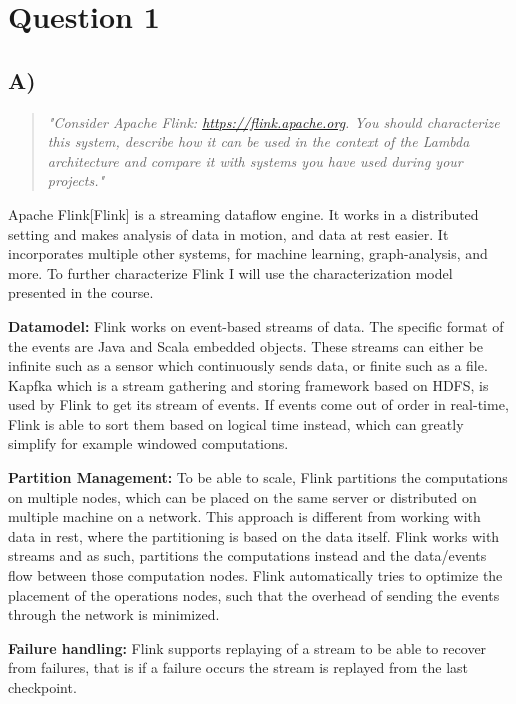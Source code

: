 \section{Question 1}

\subsection{A)}
\begin{quote}
	\textit{"Consider	Apache	Flink: \url{https://flink.apache.org}.	You	should	characterize	this	system,	describe	how	it	can	be	used	in	the	context	of	the	Lambda	architecture	and	compare	it	with	systems	you	have	used	during	your	projects."}
\end{quote}

\newpar Apache Flink[Flink] is a streaming dataflow engine. It works in a distributed setting and makes analysis of data in motion, and data at rest easier. It incorporates multiple other systems, for machine learning, graph-analysis, and more. To further characterize Flink I will use the characterization model presented in the course.

\newpar \textbf{Datamodel:} Flink works on event-based streams of data. The specific format of the events are Java and Scala embedded objects. These streams can either be infinite such as a sensor which continuously sends data, or finite such as a file. Kapfka which is a stream gathering and storing framework based on HDFS, is used by Flink to get its stream of events\cite{confluent-flink}. If events come out of order in real-time, Flink is able to sort them based on logical time instead, which can greatly simplify for example windowed computations.

\newpar \textbf{Partition Management:} To be able to scale, Flink partitions the computations on multiple nodes, which can be placed on the same server or distributed on multiple machine on a network. This approach is different from working with data in rest, where the partitioning is based on the data itself. Flink works with streams and as such, partitions the computations instead and the data/events flow between those computation nodes. Flink automatically tries to optimize the placement of the operations nodes, such that the overhead of sending the events through the network is minimized\cite{official-flink}.

\newpar \textbf{Failure handling:} Flink supports replaying of a stream to be able to recover from failures, that is if a failure occurs the stream is replayed from the last checkpoint.


